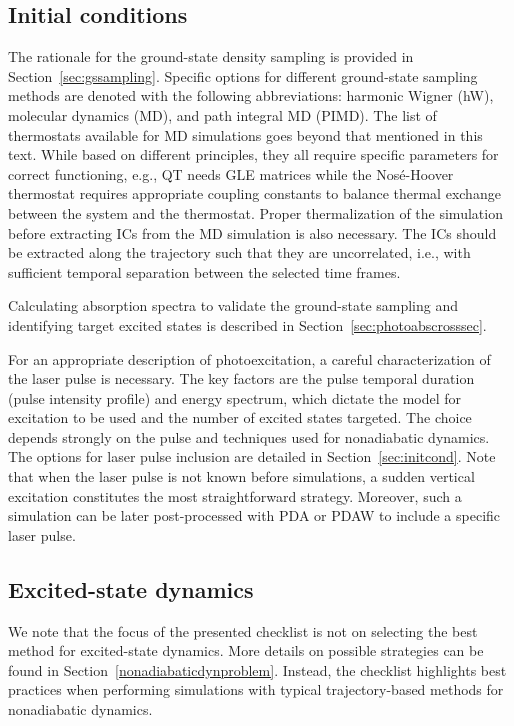 \documentclass[9pt,bestpractices]{livecoms}
\begin{document}
\subsection{Initial conditions}

The rationale for the ground-state density sampling is provided in Section~\ref{sec:gssampling}. Specific options for different ground-state sampling methods are denoted with the following abbreviations: harmonic Wigner (hW), molecular dynamics (MD), and path integral MD (PIMD). 
The list of thermostats available for MD simulations goes beyond that mentioned in this text. While based on different principles, they all require specific parameters for correct functioning, e.g., QT needs GLE matrices while the Nosé-Hoover thermostat requires appropriate coupling constants to balance thermal exchange between the system and the thermostat. Proper thermalization of the simulation before extracting ICs from the MD simulation is also necessary. The ICs should be extracted along the trajectory such that they are uncorrelated, i.e., with sufficient temporal separation between the selected time frames. 

Calculating absorption spectra to validate the ground-state sampling and identifying target excited states is described in Section~\ref{sec:photoabscrosssec}.

For an appropriate description of photoexcitation, a careful characterization of the laser pulse is necessary. The key factors are the pulse temporal duration (pulse intensity profile) and energy spectrum, which dictate the model for excitation to be used and the number of excited states targeted. The choice depends strongly on the pulse and techniques used for nonadiabatic dynamics. The options for laser pulse inclusion are detailed in Section~\ref{sec:initcond}. Note that when the laser pulse is not known before simulations, a sudden vertical excitation constitutes the most straightforward strategy. Moreover, such a simulation can be later post-processed with PDA or PDAW to include a specific laser pulse.

\subsection{Excited-state dynamics}
We note that the focus of the presented checklist is not on selecting the best method for excited-state dynamics. More details on possible strategies can be found in Section~\ref{nonadiabaticdynproblem}. Instead, the checklist highlights best practices when performing simulations with typical trajectory-based methods for nonadiabatic dynamics.
\end{document}
